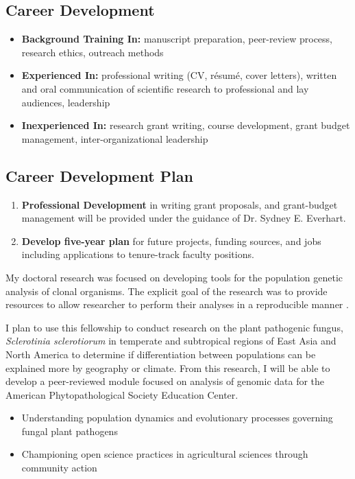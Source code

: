\documentclass[12pt,letterpaper]{article}
\begin{document}
\subsection{Career Development}

\begin{itemize}
  \item \textbf{Background Training In: } manuscript preparation, peer-review process, research ethics, outreach methods
  \item \textbf{Experienced In: } professional writing (CV, r\'esum\'e, cover letters), written and oral communication of scientific research to professional and lay audiences, leadership
  \item \textbf{Inexperienced In: } research grant writing, course development, grant budget management, inter-organizational leadership
\end{itemize}

\subsection{Career Development Plan}

\begin{enumerate}
  \item \textbf{Professional Development} in writing grant proposals, and grant-budget management will be provided under the guidance of Dr. Sydney E. Everhart.
  \item \textbf{Develop five-year plan} for future projects, funding sources, and jobs including applications to tenure-track faculty positions.  
\end{enumerate}


My doctoral research was focused on developing tools for the population genetic
analysis of clonal organisms. The explicit goal of the research was to provide
resources to allow researcher to perform their analyses in a reproducible manner
\citep{kamvar2014poppr}.

I plan to use this fellowship to conduct research on the plant pathogenic
fungus, \textit{Sclerotinia sclerotiorum} in temperate and subtropical regions
of East Asia and North America to determine if differentiation between
populations can be explained more by geography or climate. From this research, I
will be able to develop a peer-reviewed module focused on analysis of genomic
data for the American Phytopathological Society Education Center.

\begin{itemize}
  \item Understanding population dynamics and evolutionary processes governing fungal plant pathogens
  \item Championing open science practices in agricultural sciences through community action
\end{itemize}
\end{document}
